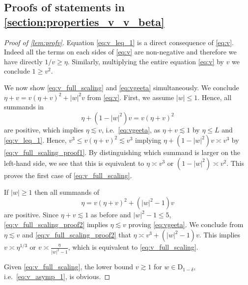 \documentclass[10pt,a4paper]{amsart}
\newcommand{\abs}[1]{\left| #1 \right|}
\numberwithin{equation}{section}
\begin{document}
	\subsection{Proofs of statements in \cref{section:properties_v_v_beta}}\label{subsection:proof_properties_v}
	\begin{proof}[Proof of \cref{lem:profv}]
		
		Equation \cref{eq:v_leq_1} is a direct consequence of \cref{eq:v}. Indeed all the terms on each sides of \cref{eq:v} are non-negative and therefore we have directly $1/v \ge \eta $. Similarly, multiplying the entire equation \cref{eq:v} by $v$ we conclude $1 \ge v^2$. 
		
		
		
		We now show \cref{eq:v_full_scaling} and \cref{eq:vgeeta} simultaneously. We conclude $\eta + v = v(\eta + v)^2 + \abs{w}^2 v$ from \cref{eq:v}.  
		First, we assume $\abs{w} \leq 1$. Hence, all summands in 
		\begin{equation} \label{eq:v_full_scaling_proof1} 
			\eta + (1 - \abs{w}^2)v = v(\eta + v)^2 
		\end{equation} 
		are positive, 
		which implies $\eta \lesssim v$, i.e.\ \cref{eq:vgeeta}, as 
		$\eta + v \lesssim 1$ by $\eta \leq L$ and \cref{eq:v_leq_1}. 
		Hence, $v^3 \leq v (\eta +v)^2 \lesssim v^3$ implying $\eta + (1- \abs{w}^2) v \asymp v^3$ by \cref{eq:v_full_scaling_proof1}. By distinguishing which summand is larger on the left-hand side, we see that this is equivalent to $ \eta\asymp v^3$ or $(1- \abs{w}^2) \asymp v^2$. This proves the first case of \cref{eq:v_full_scaling}. 
		
		If $\abs{w} \geq 1$ then all summands of 
		\begin{equation} \label{eq:v_full_scaling_proof2} 
			\eta  = v(\eta + v)^2  + (\abs{w}^2-1)v
		\end{equation} 
		are positive. Since $\eta + v \lesssim 1$ as before and $\abs{w}^2 - 1 \leq 5$, \eqref{eq:v_full_scaling_proof2} 
		implies $\eta \lesssim v$ proving \eqref{eq:vgeeta}. 
		We conclude from $\eta \lesssim v$ and \eqref{eq:v_full_scaling_proof2} that $\eta \asymp v^3 + (\abs{w}^2 - 1)v$. 
		This implies $v \asymp \eta^{1/3}$ or $v \asymp \frac{\eta}{\abs{w}^2 -1}$, which is equivalent to \eqref{eq:v_full_scaling}. 
		
		Given \eqref{eq:v_full_scaling}, the lower bound $v \gtrsim 1$ for $w \in \mathrm{D}_{1-\delta}$, i.e.\ \eqref{eq:v_asymp_1}, is obvious. 
	\end{proof} 
	
\end{document}
